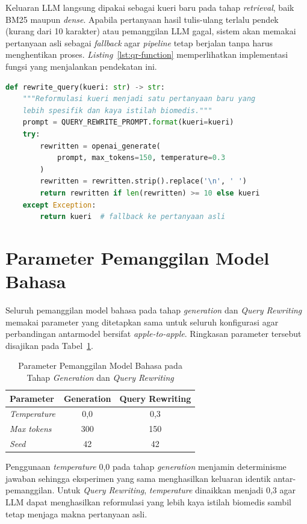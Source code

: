 Keluaran LLM langsung dipakai sebagai kueri baru pada tahap \textit{retrieval}, baik BM25 maupun \textit{dense}. Apabila pertanyaan hasil tulis-ulang terlalu pendek (kurang dari 10 karakter) atau pemanggilan LLM gagal, sistem akan memakai pertanyaan asli sebagai \textit{fallback} agar \textit{pipeline} tetap berjalan tanpa harus menghentikan proses. \textit{Listing}~\ref{lst:qr-function} memperlihatkan implementasi fungsi yang menjalankan pendekatan ini.

\begin{lstlisting}[language=Python,caption={Fungsi \textit{rewriter} \textit{single-kueri} (\texttt{rewrite\_query})},label={lst:qr-function}]
def rewrite_query(kueri: str) -> str:
    """Reformulasi kueri menjadi satu pertanyaan baru yang
    lebih spesifik dan kaya istilah biomedis."""
    prompt = QUERY_REWRITE_PROMPT.format(kueri=kueri)
    try:
        rewritten = openai_generate(
            prompt, max_tokens=150, temperature=0.3
        )
        rewritten = rewritten.strip().replace('\n', ' ')
        return rewritten if len(rewritten) >= 10 else kueri
    except Exception:
        return kueri  # fallback ke pertanyaan asli
\end{lstlisting}

\section{Parameter Pemanggilan Model Bahasa}
\label{lamp:parameter-llm}

Seluruh pemanggilan model bahasa pada tahap \textit{generation} dan \textit{Query Rewriting} memakai parameter yang ditetapkan sama untuk seluruh konfigurasi agar perbandingan antarmodel bersifat \textit{apple-to-apple}. Ringkasan parameter tersebut disajikan pada Tabel~\ref{tbl:parameter-llm}.

\begin{table}[H]
\centering
\caption{Parameter Pemanggilan Model Bahasa pada Tahap \textit{Generation} dan \textit{Query Rewriting}}
\label{tbl:parameter-llm}
\begin{tabular}{|l|c|c|}
\hline
\textbf{Parameter} & \textbf{Generation} & \textbf{Query Rewriting} \\ \hline
\textit{Temperature}            & 0{,}0 & 0{,}3 \\ \hline
\textit{Max tokens}             & 300   & 150   \\ \hline
\textit{Seed}                   & 42    & 42    \\ \hline
\end{tabular}
\end{table}

Penggunaan \textit{temperature} 0{,}0 pada tahap \textit{generation} menjamin determinisme jawaban sehingga eksperimen yang sama menghasilkan keluaran identik antar-pemanggilan. Untuk \textit{Query Rewriting}, \textit{temperature} dinaikkan menjadi 0{,}3 agar LLM dapat menghasilkan reformulasi yang lebih kaya istilah biomedis sambil tetap menjaga makna pertanyaan asli.

